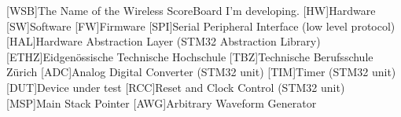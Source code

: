 \begin{acronym}
        [WSB]{The Name of the Wireless ScoreBoard I'm developing.}
        [HW]{Hardware}
        [SW]{Software}
        [FW]{Firmware}
        [SPI]{Serial Peripheral Interface (low level protocol)}
        [HAL]{Hardware Abstraction Layer (STM32 Abstraction Library)}
        [ETHZ]{Eidgenössische Technische Hochschule}
        [TBZ]{Technische Berufsschule Zürich}
        [ADC]{Analog Digital Converter (STM32 unit)}
        [TIM]{Timer (STM32 unit)}
        [DUT]{Device under test}
        [RCC]{Reset and Clock Control (STM32 unit)}
        [MSP]{Main Stack Pointer}
        [AWG]{Arbitrary Waveform Generator}
\end{acronym}
